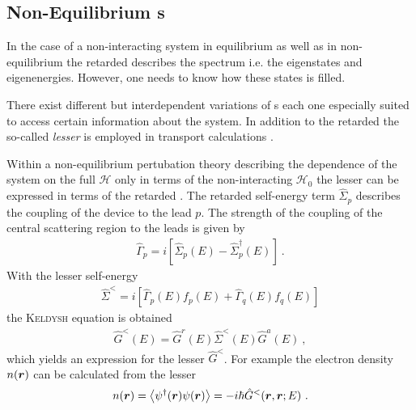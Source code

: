 \subsection{Non-Equilibrium \cgfnc s}
In the case of a non-interacting system in equilibrium as well as in non-equilibrium the retarded \gfnc{} describes the spectrum i.e. the eigenstates and eigenenergies. However, one needs to know how these states is filled.\par
There exist different but interdependent variations of \gfnc s each one especially suited to access certain information about the system.
In addition to the retarded \gfnc{} the so-called \emph{lesser \gfnc{}} is employed in transport calculations \cite{haug2008quantum}.\par
Within a non-equilibrium pertubation theory describing the dependence of the system on the full \hamil{} $\mathcal{H}$ only in terms of the non-interacting \hamil{} $\mathcal{H}_0$ \cite{Jauho2006} the lesser \gfnc{} can be expressed in terms of the retarded \gfnc{}. The retarded self-energy term $\hat{\Sigma}_p$ describes the coupling of the device to the lead $p$. The strength of the coupling of the central scattering region to the leads is given by \cite{datta2005quantum}
\begin{align}
\hat{\Gamma}_p = i\left[\hat{\Sigma}_p(E)-\hat{\Sigma}_p^{\dagger}(E)\right]\ .
\end{align}
With the lesser self-energy
\begin{align}
\hat{\Sigma}^<=i\left[\hat{\Gamma}_p(E)f_p(E)+\hat{\Gamma}_q(E)f_q(E) \right]
\end{align}
the \textsc{Keldysh} equation is obtained
\begin{align}
\hat{G}^<(E) = \hat{G}^r(E) \hat{\Sigma}^<(E) \hat{G}^a(E)\ ,
\label{eqn:keldyshequation}
\end{align}
which yields an expression for the lesser \gfnc{} $\hat{G}^<$.
For example the electron density  $n(\boldsymbol{r})$ can be calculated from the lesser \gfnc{}
\begin{align}
	n(\boldsymbol{r}) = \left< \psi^{\dagger} (\boldsymbol{r}) \psi(\boldsymbol{r})\right> = -i\hbar \hat{G}^<(\boldsymbol{r},\boldsymbol{r};E)\ .
	\label{eqn:edensfromgreensfnc}
\end{align}


